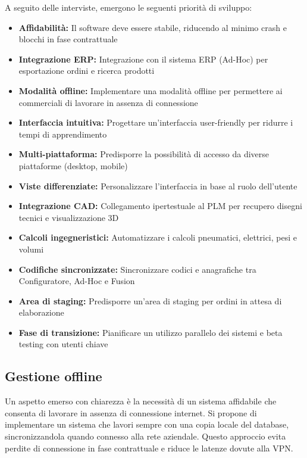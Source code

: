 \documentclass[12pt, a4paper]{article}
\begin{document}
A seguito delle interviste, emergono le seguenti priorità di sviluppo:

\begin{itemize}
      \item \textbf{Affidabilità:} Il software deve essere stabile, riducendo al minimo crash e blocchi in fase contrattuale
      \item \textbf{Integrazione ERP:} Integrazione con il sistema ERP (Ad-Hoc) per esportazione ordini e ricerca prodotti
      \item \textbf{Modalità offline:} Implementare una modalità offline per permettere ai commerciali di lavorare in assenza di connessione
      \item \textbf{Interfaccia intuitiva:} Progettare un'interfaccia user-friendly per ridurre i tempi di apprendimento
      \item \textbf{Multi-piattaforma:} Predisporre la possibilità di accesso da diverse piattaforme (desktop, mobile)
      \item \textbf{Viste differenziate:} Personalizzare l'interfaccia in base al ruolo dell'utente
      \item \textbf{Integrazione CAD:} Collegamento ipertestuale al PLM per recupero disegni tecnici e visualizzazione 3D
      \item \textbf{Calcoli ingegneristici:} Automatizzare i calcoli pneumatici, elettrici, pesi e volumi
      \item \textbf{Codifiche sincronizzate:} Sincronizzare codici e anagrafiche tra Configuratore, Ad-Hoc e Fusion
      \item \textbf{Area di staging:} Predisporre un'area di staging per ordini in attesa di elaborazione
      \item \textbf{Fase di transizione:} Pianificare un utilizzo parallelo dei sistemi e beta testing con utenti chiave
\end{itemize}

\subsection{Gestione offline}

Un aspetto emerso con chiarezza è la necessità di un sistema affidabile che consenta di lavorare in assenza di connessione internet.
Si propone di implementare un sistema che lavori sempre con una copia locale del database, sincronizzandola quando connesso alla rete aziendale.
Questo approccio evita perdite di connessione in fase contrattuale e riduce le latenze dovute alla VPN.
\end{document}
